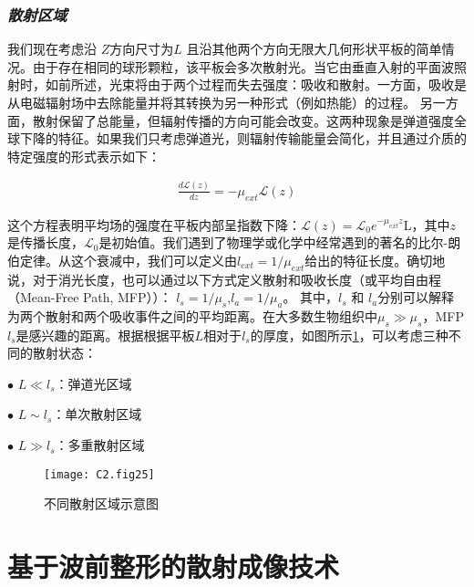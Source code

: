 \subsubsection*{\textbf{\textit{散射区域}}}

我们现在考虑沿 $Z$方向尺寸为$L$ 且沿其他两个方向无限大几何形状平板的简单情况。由于存在相同的球形颗粒，该平板会多次散射光。当它由垂直入射的平面波照射时，如前所述，光束将由于两个过程而失去强度：吸收和散射。一方面，吸收是从电磁辐射场中去除能量并将其转换为另一种形式（例如热能）的过程。 另一方面，散射保留了总能量，但辐射传播的方向可能会改变。这两种现象是弹道强度全球下降的特征。如果我们只考虑弹道光，则辐射传输能量会简化，并且通过介质的特定强度的形式表示如下：

\begin{equation}
\begin{aligned}
    \frac{d\mathcal{L}(z)}{dz} = -\mu_{ext}\mathcal{L}(z)
\end{aligned}
\label{eq:2.03}
\end{equation}

这个方程表明平均场的强度在平板内部呈指数下降：$\mathcal{L}(z) = \mathcal{L}_{0}e^{-\mu_{ext}z}$L，其中$z$是传播长度，$\mathcal{L}_{0}$是初始值。我们遇到了物理学或化学中经常遇到的著名的比尔-朗伯定律。从这个衰减中，我们可以定义由$l_{ext}=1/\mu_{ext}$给出的特征长度。确切地说，对于消光长度，也可以通过以下方式定义散射和吸收长度（或平均自由程（Mean-Free Path, MFP））： $l_{s} = 1/\mu_{s}$,$l_{a} = 1/\mu_{a}$。
其中，$l_{s}$ 和 $l_{a}$分别可以解释为两个散射和两个吸收事件之间的平均距离。在大多数生物组织中$\mu_{s} \gg \mu_{s}$，MFP$l_{s}$是感兴趣的距离。根据根据平板$L$相对于$l_{s}$的厚度，如图所示\ref{fig2:25}，可以考虑三种不同的散射状态\cite{ntziachristos_going_2010}：\par
$\bullet$ $ L \ll l_{s} $：弹道光区域\par
$\bullet$ $L \sim l_{s} $：单次散射区域\par
$\bullet$ $L \gg l_{s} $：多重散射区域\par

\begin{figure}[htp]
	\centering
	\texttt{[image: C2.fig25]}
	\caption{不同散射区域示意图\cite{ntziachristos_going_2010}}
	\label{fig2:25}
\end{figure}

\section{基于波前整形的散射成像技术}

